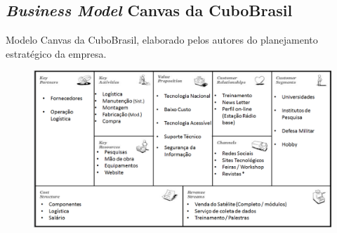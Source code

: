 \documentclass[
	12pt,				%
	openright,			%
	oneside,			%
	a4paper,			%
	english,			%
	french,				%
	spanish,			%
	brazil				%
	]{abntex2}
\begin{document}
\begin{anexosenv}

\partanexos

\chapter{\textit{Business Model} Canvas da CuboBrasil}
	Modelo Canvas da CuboBrasil, elaborado pelos autores do planejamento estratégico da empresa.
	
	\begin{figure}[th]
		\centering
		\includegraphics[width=1.0\linewidth]{./figs/Anexo_01}
	\end{figure}

\end{anexosenv}



% 









\printindex
\end{document}
